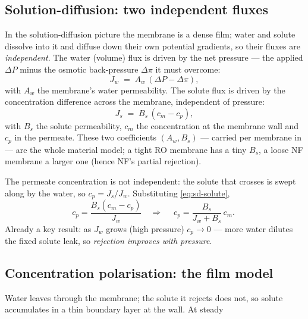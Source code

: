\documentclass[11pt,a4paper]{article}
\begin{document}
\subsection{Solution-diffusion: two independent fluxes}

In the solution-diffusion picture \cite{WijmansBaker} the membrane is a
dense film; water and solute dissolve into it and diffuse down their
own potential gradients, so their fluxes are \emph{independent}.  The
water (volume) flux is driven by the net pressure --- the applied
$\Delta P$ minus the osmotic back-pressure $\Delta\pi$ it must overcome:
\begin{equation}
   J_w \;=\; A_w\,(\Delta P - \Delta\pi),
   \label{eq:sd-water}
\end{equation}
with $A_w$ the membrane's water permeability.  The solute flux is
driven by the concentration difference across the membrane, independent
of pressure:
\begin{equation}
   J_s \;=\; B_s\,(c_m - c_p),
   \label{eq:sd-solute}
\end{equation}
with $B_s$ the solute permeability, $c_m$ the concentration at the
membrane wall and $c_p$ in the permeate.  These two coefficients
$(A_w, B_s)$ --- carried per membrane in
 --- are the whole material model; a
tight RO membrane has a tiny $B_s$, a loose NF membrane a larger one
(hence NF's partial rejection).

The permeate concentration is not independent: the solute that crosses
is swept along by the water, so $c_p = J_s/J_w$.  Substituting
\eqref{eq:sd-solute},
\begin{equation}
   c_p = \frac{B_s(c_m-c_p)}{J_w}
   \quad\Longrightarrow\quad
   \boxed{\;c_p = \frac{B_s}{J_w + B_s}\,c_m.\;}
   \label{eq:cp}
\end{equation}
Already a key result: as $J_w$ grows (high pressure) $c_p \to 0$ ---
more water dilutes the fixed solute leak, so \emph{rejection improves
with pressure}.

\subsection{Concentration polarisation: the film model}

Water leaves through the membrane; the solute it rejects does not, so
solute accumulates in a thin boundary layer at the wall.  At steady
\end{document}

